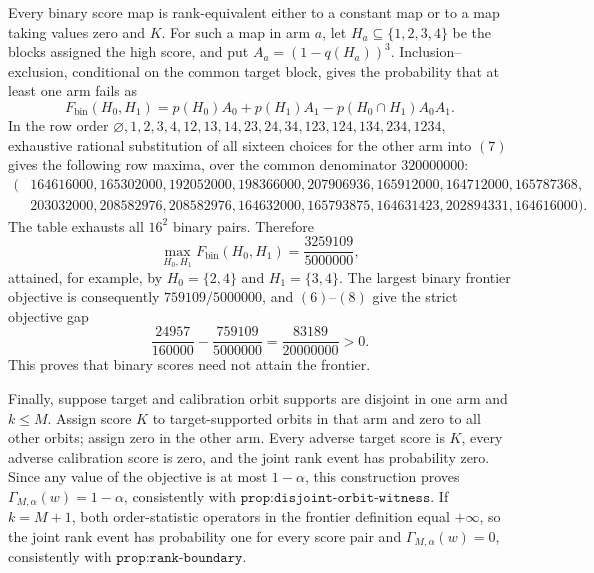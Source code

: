 Every binary score map is rank-equivalent either to a constant map or to a map taking values zero and \(K\). For such a map in arm \(a\), let \(H_a\subseteq\{1,2,3,4\}\) be the blocks assigned the high score, and put \(A_a=(1-q(H_a))^3\). Inclusion--exclusion, conditional on the common target block, gives the probability that at least one arm fails as
\[
F_{\mathrm{bin}}(H_0,H_1)=p(H_0)A_0+p(H_1)A_1-p(H_0\cap H_1)A_0A_1.
\tag{7}
\]
In the row order \(\varnothing,1,2,3,4,12,13,14,23,24,34,123,124,134,234,1234\), exhaustive rational substitution of all sixteen choices for the other arm into \((7)\) gives the following row maxima, over the common denominator \(320000000\):
\[
\begin{split}
(&164616000,165302000,192052000,198366000,207906936,165912000,164712000,165787368,\\
&203032000,208582976,208582976,164632000,165793875,164631423,202894331,164616000).
\end{split}
\tag{8}
\]
The table exhausts all \(16^2\) binary pairs. Therefore
\[
\max_{H_0,H_1}F_{\mathrm{bin}}(H_0,H_1)=\frac{3259109}{5000000},
\]
attained, for example, by \(H_0=\{2,4\}\) and \(H_1=\{3,4\}\). The largest binary frontier objective is consequently \(759109/5000000\), and \((6)\)--\((8)\) give the strict objective gap
\[
\frac{24957}{160000}-\frac{759109}{5000000}=\frac{83189}{20000000}>0.
\]
This proves that binary scores need not attain the frontier.

Finally, suppose target and calibration orbit supports are disjoint in one arm and \(k\le M\). Assign score \(K\) to target-supported orbits in that arm and zero to all other orbits; assign zero in the other arm. Every adverse target score is \(K\), every adverse calibration score is zero, and the joint rank event has probability zero. Since any value of the objective is at most \(1-\alpha\), this construction proves \(\Gamma_{M,\alpha}(w)=1-\alpha\), consistently with \(\texttt{prop:disjoint-orbit-witness}\). If \(k=M+1\), both order-statistic operators in the frontier definition equal \(+\infty\), so the joint rank event has probability one for every score pair and \(\Gamma_{M,\alpha}(w)=0\), consistently with \(\texttt{prop:rank-boundary}\).
